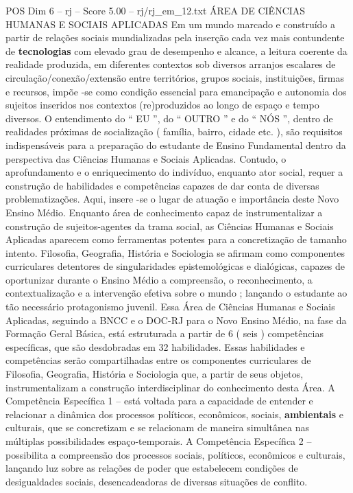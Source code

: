 \begin{textsample}{POS Dim 6 – rj – Score 5.00 – rj/rj\_em\_12.txt}  \label{ex:f6_pos_280}
ÁREA DE CIÊNCIAS HUMANAS E SOCIAIS APLICADAS Em um mundo marcado e construído a partir de relações sociais mundializadas pela inserção cada vez mais contundente de \textbf{tecnologias} com elevado grau de desempenho e alcance, a leitura coerente da realidade produzida, em diferentes contextos sob diversos arranjos escalares de circulação/conexão/extensão entre territórios, grupos sociais, instituições, firmas e recursos, impõe -se como condição essencial para emancipação e autonomia dos sujeitos inseridos nos contextos (re)produzidos ao longo de espaço e tempo diversos.
O entendimento do “ EU ”, do “ OUTRO ” e do “ NÓS ”, dentro de realidades próximas de socialização ( família, bairro, cidade etc. ), são requisitos indispensáveis para a preparação do estudante de Ensino Fundamental dentro da perspectiva das Ciências Humanas e Sociais Aplicadas.
Contudo, o aprofundamento e o enriquecimento do indivíduo, enquanto ator social, requer a construção de habilidades e competências capazes de dar conta de diversas problematizações.
Aqui, insere -se o lugar de atuação e importância deste Novo Ensino Médio.
Enquanto área de conhecimento capaz de instrumentalizar a construção de sujeitos-agentes da trama social, as Ciências Humanas e Sociais Aplicadas aparecem como ferramentas potentes para a concretização de tamanho intento.
Filosofia, Geografia, História e Sociologia se afirmam como componentes curriculares detentores de singularidades epistemológicas e dialógicas, capazes de oportunizar durante o Ensino Médio a compreensão, o reconhecimento, a contextualização e a intervenção efetiva sobre o mundo ; lançando o estudante ao tão necessário protagonismo juvenil.
Essa Área de Ciências Humanas e Sociais Aplicadas, seguindo a BNCC e o DOC-RJ para o Novo Ensino Médio, na fase da Formação Geral Básica, está estruturada a partir de 6 ( seis ) competências específicas, que são desdobradas em 32 habilidades.
Essas habilidades e competências serão compartilhadas entre os componentes curriculares de Filosofia, Geografia, História e Sociologia que, a partir de seus objetos, instrumentalizam a construção interdisciplinar do conhecimento desta Área.
A Competência Específica 1 – está voltada para a capacidade de entender e relacionar a dinâmica dos processos políticos, econômicos, sociais, \textbf{ambientais} e culturais, que se concretizam e se relacionam de maneira simultânea nas múltiplas possibilidades espaço-temporais.
A Competência Específica 2 – possibilita a compreensão dos processos sociais, políticos, econômicos e culturais, lançando luz sobre as relações de poder que estabelecem condições de desigualdades sociais, desencadeadoras de diversas situações de conflito.

\end{textsample}
